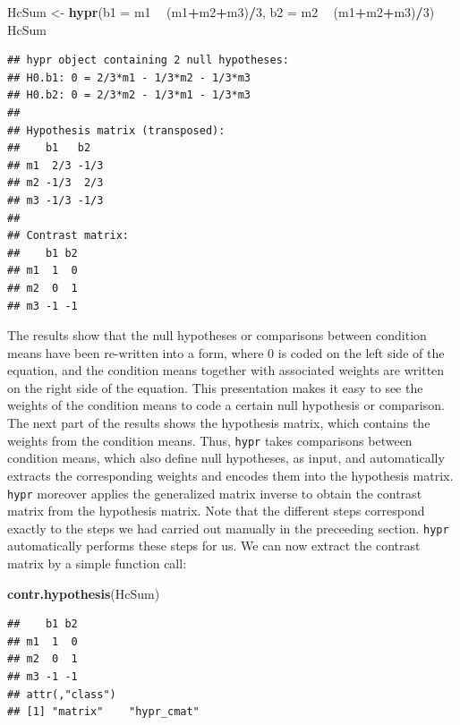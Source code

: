 \documentclass[12pt,]{krantz}
\newenvironment{Shaded}{\begin{snugshade}}{\end{snugshade}}
\newcommand{\DataTypeTok}[1]{\textcolor[rgb]{0.13,0.29,0.53}{#1}}
\newcommand{\DecValTok}[1]{\textcolor[rgb]{0.00,0.00,0.81}{#1}}
\newcommand{\KeywordTok}[1]{\textcolor[rgb]{0.13,0.29,0.53}{\textbf{#1}}}
\newcommand{\NormalTok}[1]{#1}
\newcommand{\OperatorTok}[1]{\textcolor[rgb]{0.81,0.36,0.00}{\textbf{#1}}}
\newcommand{\StringTok}[1]{\textcolor[rgb]{0.31,0.60,0.02}{#1}}
\theoremstyle{definition}
\theoremstyle{definition}
\theoremstyle{definition}
\theoremstyle{remark}
\begin{document}
\begin{Shaded}
\begin{Highlighting}[]
\NormalTok{HcSum <-}\StringTok{ }\KeywordTok{hypr}\NormalTok{(}\DataTypeTok{b1 =}\NormalTok{ m1 }\OperatorTok{~}\StringTok{ }\NormalTok{(m1}\OperatorTok{+}\NormalTok{m2}\OperatorTok{+}\NormalTok{m3)}\OperatorTok{/}\DecValTok{3}\NormalTok{, }\DataTypeTok{b2 =}\NormalTok{ m2 }\OperatorTok{~}\StringTok{ }\NormalTok{(m1}\OperatorTok{+}\NormalTok{m2}\OperatorTok{+}\NormalTok{m3)}\OperatorTok{/}\DecValTok{3}\NormalTok{)}
\NormalTok{HcSum}
\end{Highlighting}
\end{Shaded}

\begin{verbatim}
## hypr object containing 2 null hypotheses:
## H0.b1: 0 = 2/3*m1 - 1/3*m2 - 1/3*m3
## H0.b2: 0 = 2/3*m2 - 1/3*m1 - 1/3*m3
## 
## Hypothesis matrix (transposed):
##    b1   b2  
## m1  2/3 -1/3
## m2 -1/3  2/3
## m3 -1/3 -1/3
## 
## Contrast matrix:
##    b1 b2
## m1  1  0
## m2  0  1
## m3 -1 -1
\end{verbatim}

The results show that the null hypotheses or comparisons between condition means have been re-written into a form, where \(0\) is coded on the left side of the equation, and the condition means together with associated weights are written on the right side of the equation. This presentation makes it easy to see the weights of the condition means to code a certain null hypothesis or comparison. The next part of the results shows the hypothesis matrix, which contains the weights from the condition means. Thus, \texttt{hypr} takes comparisons between condition means, which also define null hypotheses, as input, and automatically extracts the corresponding weights and encodes them into the hypothesis matrix. \texttt{hypr} moreover applies the generalized matrix inverse to obtain the contrast matrix from the hypothesis matrix. Note that the different steps correspond exactly to the steps we had carried out manually in the preceeding section. \texttt{hypr} automatically performs these steps for us. We can now extract the contrast matrix by a simple function call:

\begin{Shaded}
\begin{Highlighting}[]
\KeywordTok{contr.hypothesis}\NormalTok{(HcSum)}
\end{Highlighting}
\end{Shaded}

\begin{verbatim}
##    b1 b2
## m1  1  0
## m2  0  1
## m3 -1 -1
## attr(,"class")
## [1] "matrix"    "hypr_cmat"
\end{verbatim}
\end{document}
